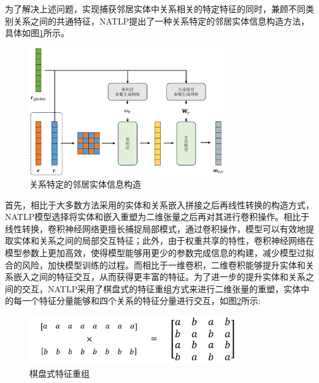 为了解决上述问题，实现捕获邻居实体中关系相关的特定特征的同时，兼顾不同类别关系之间的共通特征，NATLP提出了一种关系特定的邻居实体信息构造方法，具体如图\ref{build_information}所示。

\begin{figure}[htb]
  \centerline{\includegraphics[width=0.75\textwidth]{pic/build_information.pdf}}
  \caption{关系特定的邻居实体信息构造}
  \label{build_information}
\end{figure}

首先，相比于大多数方法采用的实体和关系嵌入拼接之后再线性转换的构造方式，NATLP模型选择将实体和嵌入重塑为二维张量之后再对其进行卷积操作。相比于线性转换，卷积神经网络更擅长捕捉局部模式，通过卷积操作，模型可以有效地提取实体和关系之间的局部交互特征；此外，由于权重共享的特性，卷积神经网络在模型参数上更加高效，使得模型能够用更少的参数完成信息的构建，减少模型过拟合的风险，加快模型训练的过程。而相比于一维卷积，二维卷积能够提升实体和关系嵌入之间的特征交互，从而获得更丰富的特征。为了进一步的提升实体和关系之间的交互，NATLP采用了棋盘式的特征重组方式来进行二维张量的重塑，实体中的每一个特征分量能够和四个关系的特征分量进行交互，如图\ref{cross_conv}所示:

\begin{figure}[htb]
  \centerline{\includegraphics[width=0.8\textwidth]{pic/cross_conv.pdf}}
  \caption{棋盘式特征重组}
  \label{cross_conv}
\end{figure}

